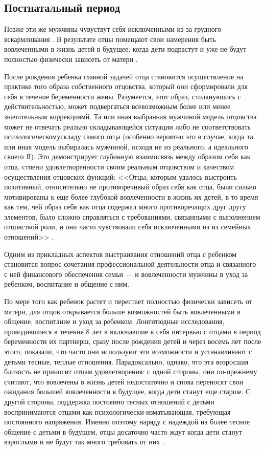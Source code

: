 \documentclass{../../common/thesisbyxetex}
\begin{document}
\subsection{Постнатальный период}



Позже эти же мужчины чувуствут себя исключенными
из-за грудного вскармливания \cite[21]{long}. В результате отцы помещают свои намерения быть
вовлеченными в жизнь детей в будущее, когда дети подрастут и уже не будут полностью физически
зависеть от матери \cite[22]{long}.


После рождения ребенка главной задачей отца становится осуществление на практике того образа
собственного отцовства, который они сформировали для себя в течение беременности жены. Разумеется,
этот образ, столкнувшись с действительностью, может подвергаться всевозможным более или менее
значительным коррекциямй. Та или иная выбранная мужчиной модель отцовства может не отвечать реально
складывающейся ситуации либо не соответствовать психологическомускладу самого отца (особенно
вероятно это в случае, когда та или иная модель выбиралась мужчиной, исходя не из реального, а
идеального своего Я). Это демонстрирует глубинную взаимосвязь между образом себя как отца, стпени
удовлетворенности своим реальным отцовством и качеством осуществления
отцовских функций: <<Отцы, которым удалось выстроить позитивный, относительно не противоречивый
образ себя как отца, были сильно мотивированы к еще более глубокой вовлеченности в жизнь их
детей, в то время как тем, чей образ себя как отца содержал много противоречащих друг другу
элементов, было сложно справляться с требованиями, связанными с выполнением отцовсткой роли, и
они часто чувствовали себя исключенными из из семейных отношений>> \cite[314]{flit}.

Одним из прикладных аспектов выстраивания отношений отца с ребенком становится вопрос сочетания
профессиональной деятельности отца и связанного с ней финансового обеспечения семьи --- и
вовлеченности мужчины в уход за ребенком,  воспитание и общение с ним.

По мере того как ребенок растет и перестает полностью физически зависеть от матери, для отцов
открывается больше возможностей быть вовлеченными в общение, воспитание и уход за ребенком.
Лонгитюдные исследования, проводившиеся в течение 8 лет в включавшие в себя интервью с отцами
в период беременности их партнерш, сразу после рождения детей и через восемь лет после этого,
показали, что часто они используют эти возможности и устанавливают с детьми тесные, теплые
отношения. Парадоксально, однако, что эта возросшая близость не приносит отцам удовлетворения: с
одной стороны, они по-прежнему считают, что вовлечены в жизнь детей недостаточно и снова переносят
свои ожидания большей вовлеченности в будущее, когда дети станут еще старше. С другой стороны,
поддержка постоянно тесных отношений с детьми воспринимаются отцами как
психологически-изматывающая, требующая постоянного напряжения. Именно поэтому наряду с надеждой
на более тесное общение с детьми в будущем, отцы досаточно часто
ждут когда дети станут взрослыми и не будут так много требовать от них \cite[22]{long}.
\end{document}
